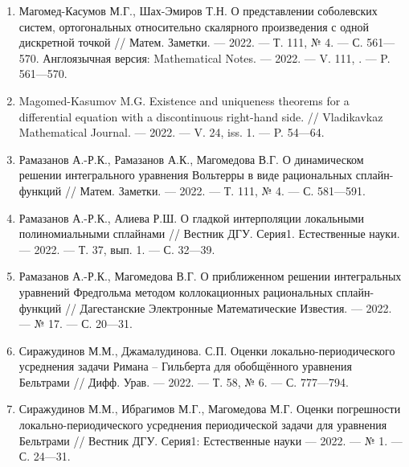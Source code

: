 \begin{enumerate}[1]

    \item
    Магомед-Касумов М.Г., Шах-Эмиров Т.Н.
    О представлении соболевских систем, ортогональных относительно скалярного произведения с одной дискретной точкой
    //
    Матем. Заметки.
    --- 2022.
    --- Т. 111, № 4.
    --- С. 561---570. 
    Англоязычная версия:
    Mathematical Notes. 
    --- 2022.
    --- V. 111, .
    --- P. 561---570.
    
    \item
    Magomed-Kasumov M.G.
    Existence and uniqueness theorems for a differential equation with a discontinuous right-hand side.
    //
    Vladikavkaz Mathematical Journal.
    --- 2022.
    --- V. 24, iss. 1.
    --- P. 54---64.


    
    \item
    Рамазанов А.-Р.К., Рамазанов А.К., Магомедова В.Г.
    О динамическом решении интегрального уравнения Вольтерры в виде рациональных сплайн-функций
    //
    Матем. Заметки.
    --- 2022.
    --- Т. 111, № 4.
    --- С. 581---591. 
    
    \item
    Рамазанов А.-Р.К., Алиева Р.Ш.
    О гладкой интерполяции локальными полиномиальными сплайнами
    //
    Вестник ДГУ. Серия1. Естественные науки.
    --- 2022.
    --- Т. 37, вып. 1.
    --- С. 32---39.
    
    \item
    Рамазанов А.-Р.К., Магомедова В.Г.
    О приближенном решении интегральных уравнений Фредгольма методом коллокационных рациональных сплайн-функций
    //
    Дагестанские Электронные Математические Известия.
    --- 2022.
    --- № 17.
    --- С. 20---31.


    
    \item
    Сиражудинов М.М., Джамалудинова. С.П.
    Оценки локально-периодического усреднения задачи Римана – Гильберта для обобщённого уравнения Бельтрами
    //
    Дифф. Урав.
    --- 2022.
    --- Т. 58, № 6.
    --- С. 777---794. 
    
    \item
    Сиражудинов М.М., Ибрагимов М.Г., Магомедова М.Г.
    Оценки погрешности локально-периодического усреднения периодической задачи для уравнения Бельтрами
    //
    Вестник ДГУ. Серия1: Естественные науки
    --- 2022.
    --- № 1.
    --- С. 24---31.


    

\end{enumerate}
